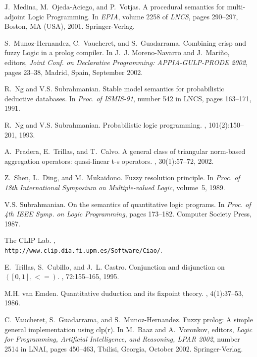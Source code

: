 \documentclass[runningheads,a4paper]{llncs}
\begin{document}
\begin{thebibliography}{10}
J.~Medina, M.~Ojeda-Aciego, and P.~Votjas.
\newblock A procedural semantics for multi-adjoint {L}ogic {P}rogramming.
\newblock In {\em EPIA}, volume 2258 of {\em LNCS}, pages 290--297, Boston, MA
  (USA), 2001. Springer-Verlag.

S.~Munoz-Hernandez, C.~Vaucheret, and S.~Guadarrama.
\newblock Combining crisp and fuzzy {L}ogic in a prolog compiler.
\newblock In J.~J. Moreno-Navarro and J.~Mari{\~n}o, editors, {\em Joint Conf.
  on Declarative {P}rogramming: APPIA-GULP-PRODE 2002}, pages 23--38, Madrid,
  Spain, September 2002.

R.~Ng and V.S. Subrahmanian.
\newblock Stable model semantics for probabilistic deductive databases.
\newblock In {\em Proc. of ISMIS-91}, number 542 in LNCS, pages 163--171, 1991.

R.~Ng and V.S. Subrahmanian.
\newblock Probabilistic logic programming.
, 101(2):150--201, 1993.

A.~Pradera, E.~Trillas, and T.~Calvo.
\newblock A general class of triangular norm-based aggregation operators:
  quasi-linear t-s operators.
, 30(1):57--72,
  2002.

Z.~Shen, L.~Ding, and M.~Mukaidono.
\newblock Fuzzy resolution principle.
\newblock In {\em Proc. of 18th International Symposium on Multiple-valued
  {L}ogic}, volume~5, 1989.

V.S. Subrahmanian.
\newblock On the semantics of quantitative logic programs.
\newblock In {\em Proc. of 4th IEEE Symp. on {L}ogic {P}rogramming}, pages
  173--182. Computer Society Press, 1987.

{The CLIP Lab}.
, \\
  \texttt{http://www.clip.dia.fi.upm.es/Software/Ciao/}.

E.~Trillas, S.~Cubillo, and J.~L. Castro.
\newblock Conjunction and disjunction on $([0,1],<=)$.
, 72:155--165, 1995.

M.H. van Emden.
\newblock Quantitative duduction and its fixpoint theory.
, 4(1):37--53, 1986.

C.~Vaucheret, S.~Guadarrama, and S.~Munoz-Hernandez.
\newblock Fuzzy prolog: A simple general implementation using clp(r).
\newblock In M.~Baaz and A.~Voronkov, editors, {\em {L}ogic for {P}rogramming,
  Artificial Intelligence, and Reasoning, LPAR 2002}, number 2514 in LNAI,
  pages 450--463, Tbilisi, Georgia, October 2002. Springer-Verlag.


\end{thebibliography}
\end{document}
